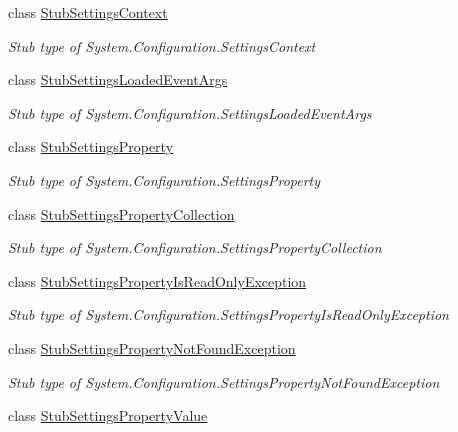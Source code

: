\begin{DoxyCompactItemize}
class \hyperlink{class_system_1_1_configuration_1_1_fakes_1_1_stub_settings_context}{Stub\-Settings\-Context}
\begin{DoxyCompactList}\small\item\em Stub type of System.\-Configuration.\-Settings\-Context\end{DoxyCompactList}\item 
class \hyperlink{class_system_1_1_configuration_1_1_fakes_1_1_stub_settings_loaded_event_args}{Stub\-Settings\-Loaded\-Event\-Args}
\begin{DoxyCompactList}\small\item\em Stub type of System.\-Configuration.\-Settings\-Loaded\-Event\-Args\end{DoxyCompactList}\item 
class \hyperlink{class_system_1_1_configuration_1_1_fakes_1_1_stub_settings_property}{Stub\-Settings\-Property}
\begin{DoxyCompactList}\small\item\em Stub type of System.\-Configuration.\-Settings\-Property\end{DoxyCompactList}\item 
class \hyperlink{class_system_1_1_configuration_1_1_fakes_1_1_stub_settings_property_collection}{Stub\-Settings\-Property\-Collection}
\begin{DoxyCompactList}\small\item\em Stub type of System.\-Configuration.\-Settings\-Property\-Collection\end{DoxyCompactList}\item 
class \hyperlink{class_system_1_1_configuration_1_1_fakes_1_1_stub_settings_property_is_read_only_exception}{Stub\-Settings\-Property\-Is\-Read\-Only\-Exception}
\begin{DoxyCompactList}\small\item\em Stub type of System.\-Configuration.\-Settings\-Property\-Is\-Read\-Only\-Exception\end{DoxyCompactList}\item 
class \hyperlink{class_system_1_1_configuration_1_1_fakes_1_1_stub_settings_property_not_found_exception}{Stub\-Settings\-Property\-Not\-Found\-Exception}
\begin{DoxyCompactList}\small\item\em Stub type of System.\-Configuration.\-Settings\-Property\-Not\-Found\-Exception\end{DoxyCompactList}\item 
class \hyperlink{class_system_1_1_configuration_1_1_fakes_1_1_stub_settings_property_value}{Stub\-Settings\-Property\-Value}

\end{DoxyCompactItemize}
